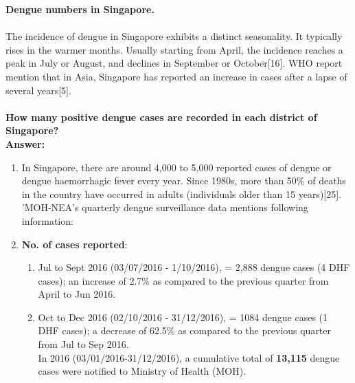 \documentclass[11pt]{exam}
\begin{document}
\begin{questions}
\newpage
\textbf{Dengue numbers in Singapore.} \\ \\
The incidence of dengue in Singapore exhibits a distinct seasonality. It typically rises in the warmer months. Usually starting from April, the incidence reaches a peak in July or August, and declines in September or October[16]. 
WHO report mention that in Asia, Singapore has reported an increase in cases after a lapse of several years[5].\\ \\ 
\question
\label{17. Dengue: Number of positive dengue cases}
\textbf{How many positive dengue cases are recorded in each district of Singapore?} \\
\textbf{Answer:}\\
\begin{enumerate}
\item In Singapore, there are around 4,000 to 5,000 reported cases of dengue or dengue haemorrhagic fever every year. Since 1980s, more than 50\% of deaths in the country have occurred in adults (individuals older than 15 years)[25].
'MOH-NEA's quarterly dengue surveillance data mentions following information:\\
\item \textbf{No. of cases reported}: \begin{enumerate}
\item Jul to Sept 2016 (03/07/2016 - 1/10/2016), =  2,888 dengue cases (4 DHF cases); an increase of 2.7\% as compared to the previous quarter from April to Jun 2016.
\item Oct to Dec 2016 (02/10/2016 - 31/12/2016), =  1084 dengue cases (1 DHF cases); a decrease of 62.5\% as compared to the previous quarter from Jul to Sep 2016. 
\\
In 2016 (03/01/2016-31/12/2016), a cumulative total of \textbf{13,115} dengue
cases were notified to Ministry of Health (MOH). \end{enumerate}


\end{enumerate}
\end{questions}
\end{document}
